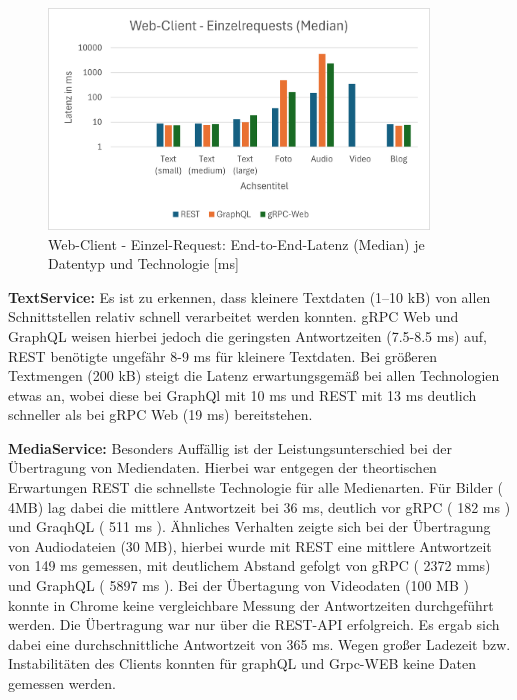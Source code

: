 \clearpage

\begin{figure}[htbp]
	\centering
	\includegraphics[width=0.9\textwidth]{images/Webclient.png}
	\caption{Web-Client - Einzel-Request: End-to-End-Latenz (Median) je Datentyp und Technologie [ms]}
	\label{fig:webclient-single-median}
\end{figure}

\textbf{TextService:}  
Es ist zu erkennen, dass kleinere Textdaten (1–10 kB) von allen Schnittstellen relativ schnell verarbeitet werden konnten. gRPC Web und GraphQL weisen hierbei jedoch die geringsten Antwortzeiten (7.5-8.5 ms) auf, REST benötigte ungefähr 8-9 ms für kleinere Textdaten. Bei größeren Textmengen (200 kB) steigt die Latenz erwartungsgemäß bei allen Technologien etwas an, wobei diese bei GraphQl mit 10 ms und REST mit 13 ms deutlich schneller als bei gRPC Web (19 ms) bereitstehen. 

\textbf{MediaService:}  
Besonders Auffällig ist der Leistungsunterschied bei der Übertragung von Mediendaten.
Hierbei war entgegen der theortischen Erwartungen REST die schnellste Technologie für alle Medienarten. Für Bilder ( 4MB) lag dabei die mittlere Antwortzeit bei 36 ms, deutlich vor gRPC ( 182 ms ) und GraqhQL ( 511 ms ).
Ähnliches Verhalten zeigte sich bei der Übertragung von Audiodateien (30 MB), hierbei wurde mit REST eine mittlere Antwortzeit von 149 ms gemessen, mit deutlichem Abstand gefolgt von gRPC ( 2372 mms) und GraphQL ( 5897  ms ).
Bei der Übertagung von Videodaten (100 MB ) konnte in Chrome keine vergleichbare Messung der Antwortzeiten durchgeführt werden. Die Übertragung war nur über die REST-API erfolgreich. Es ergab sich dabei eine durchschnittliche Antwortzeit von 365 ms. Wegen großer Ladezeit bzw. Instabilitäten des Clients konnten für graphQL und Grpc-WEB keine Daten gemessen werden. 


